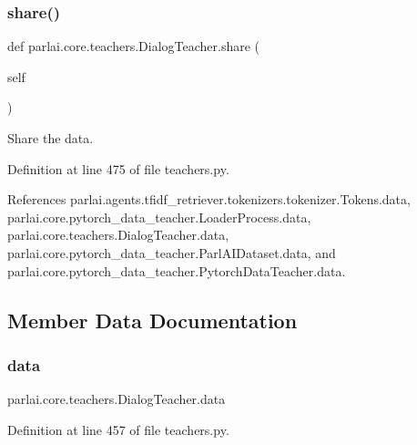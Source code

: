 \subsubsection{\texorpdfstring{share()}{share()}}
{\footnotesize\ttfamily def parlai.\+core.\+teachers.\+Dialog\+Teacher.\+share (\begin{DoxyParamCaption}\item[{}]{self }\end{DoxyParamCaption})}

\begin{DoxyVerb}Share the data.\end{DoxyVerb}
 

Definition at line 475 of file teachers.\+py.



References parlai.\+agents.\+tfidf\+\_\+retriever.\+tokenizers.\+tokenizer.\+Tokens.\+data, parlai.\+core.\+pytorch\+\_\+data\+\_\+teacher.\+Loader\+Process.\+data, parlai.\+core.\+teachers.\+Dialog\+Teacher.\+data, parlai.\+core.\+pytorch\+\_\+data\+\_\+teacher.\+Parl\+A\+I\+Dataset.\+data, and parlai.\+core.\+pytorch\+\_\+data\+\_\+teacher.\+Pytorch\+Data\+Teacher.\+data.



\subsection{Member Data Documentation}
\mbox{\label{classparlai_1_1core_1_1teachers_1_1DialogTeacher_a6089018ef23e5f55862292d25628e6a5}} 
\subsubsection{\texorpdfstring{data}{data}}
{\footnotesize\ttfamily parlai.\+core.\+teachers.\+Dialog\+Teacher.\+data}



Definition at line 457 of file teachers.\+py.




